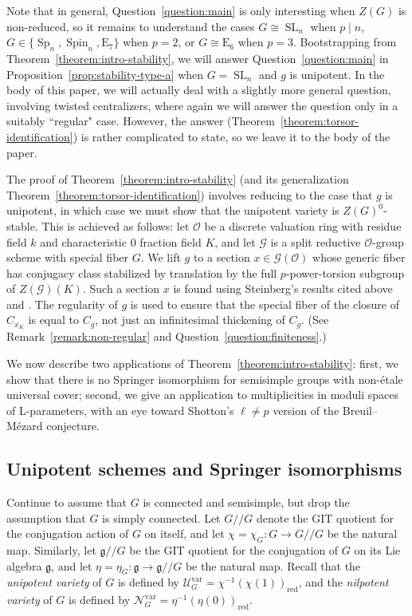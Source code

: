 \documentclass[11pt,reqno]{amsart}
\theoremstyle{definition}
\renewcommand{\rm}{\mathrm}
\newcommand{\cG}{\mathcal{G}}
\newcommand{\cO}{\mathcal{O}}
\newcommand{\sN}{{\mathscr N}}
\newcommand{\sU}{{\mathscr U}}
\newcommand{\fg}{\mathfrak{g}}
\DeclareMathOperator{\SL}{SL}
\DeclareMathOperator{\Sp}{Sp}
\DeclareMathOperator{\Spin}{Spin}
\begin{document}
Note that in general, Question~\ref{question:main} is only interesting when $Z(G)$ is non-reduced, so it remains to understand the cases $G \cong \SL_n$ when $p \mid n$, $G \in \{\Sp_n, \Spin_n, \mathrm{E}_7\}$ when $p = 2$, or $G \cong \mathrm{E}_6$ when $p = 3$. Bootstrapping from Theorem~\ref{theorem:intro-stability}, we will answer Question~\ref{question:main} in Proposition~\ref{prop:stability-type-a} when $G = \SL_n$ and $g$ is unipotent. In the body of this paper, we will actually deal with a slightly more general question, involving twisted centralizers, where again we will answer the question only in a suitably 	``regular" case. However, the answer (Theorem~\ref{theorem:torsor-identification}) is rather complicated to state, so we leave it to the body of the paper.

The proof of Theorem~\ref{theorem:intro-stability} (and its generalization Theorem~\ref{theorem:torsor-identification}) involves reducing to the case that $g$ is unipotent, in which case we must show that the unipotent variety is $Z(G)^0$-stable. This is achieved as follows: let $\cO$ be a discrete valuation ring with residue field $k$ and characteristic $0$ fraction field $K$, and let $\cG$ is a split reductive $\cO$-group scheme with special fiber $G$. We lift $g$ to a section $x \in \cG(\cO)$ whose generic fiber has conjugacy class stabilized by translation by the full $p$-power-torsion subgroup of $Z(\cG)(K)$. Such a section $x$ is found using Steinberg's results cited above and \cite[Theorem 9.1(b)]{SteinbergEndomorphisms}. The regularity of $g$ is used to ensure that the special fiber of the closure of $C_{x_K}$ is equal to $C_g$, not just an infinitesimal thickening of $C_g$. (See Remark~\ref{remark:non-regular} and Question~\ref{question:finiteness}.)

We now describe two applications of Theorem~\ref{theorem:intro-stability}: first, we show that there is no Springer isomorphism for semisimple groups with non-\'etale universal cover; second, we give an application to multiplicities in moduli spaces of L-parameters, with an eye toward Shotton's $\ell \neq p$ version of the Breuil--M\'ezard conjecture.

\subsection{Unipotent schemes and Springer isomorphisms}

Continue to assume that $G$ is connected and semisimple, but drop the assumption that $G$ is simply connected. Let $G/\!/ G$ denote the GIT quotient for the conjugation action of $G$ on itself, and let $\chi = \chi_G\colon G \to G/\!/ G$ be the natural map. Similarly, let $\fg/\!/G$ be the GIT quotient for the conjugation of $G$ on its Lie algebra $\fg$, and let $\eta = \eta_G\colon \fg \to \fg/\!/G$ be the natural map. Recall that the \textit{unipotent variety} of $G$ is defined by $\sU_G^{\rm{var}} = \chi^{-1}(\chi(1))_{\rm{red}}$, and the \textit{nilpotent variety} of $G$ is defined by $\sN_G^{\rm{var}} = \eta^{-1}(\eta(0))_{\rm{red}}$.
\end{document}
